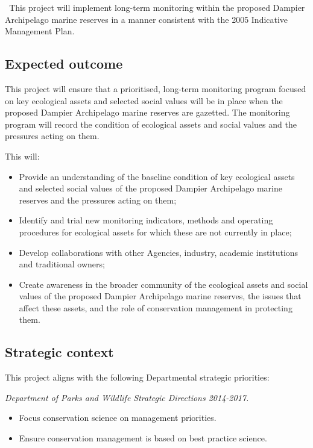 \documentclass[version=last,
    paper=a4, %
    10pt, %
    usenames,
    dvipsnames,
    twoside, %
    headings=openany, %
    BCOR=7mm, %
    DIV=15, %
    toc=chapterentrywithdots %
]{scrbook}
\begin{document}
\emph{~}This project will implement long-term monitoring within the
proposed Dampier Archipelago marine reserves in a manner consistent with
the 2005 Indicative Management Plan.~



\subsection*{Expected outcome}
This project will ensure that a prioritised, long-term monitoring
program focused on key ecological assets and selected social values will
be in place when the proposed Dampier Archipelago marine reserves are
gazetted. The monitoring program will record the condition of ecological
assets and social values and the pressures acting on them.

This will:

\begin{itemize}
\itemsep1pt\parskip0pt
\item
  Provide an understanding of the baseline condition of key ecological
  assets and selected social values of the proposed Dampier Archipelago
  marine reserves and the pressures acting on them;
\item
  Identify and trial new monitoring indicators, methods and operating
  procedures for ecological assets for which these are not currently in
  place;
\item
  Develop collaborations with other Agencies, industry, academic
  institutions and traditional owners;
\item
  Create awareness in the broader community of the ecological assets and
  social values of the proposed Dampier Archipelago marine reserves, the
  issues that affect these assets, and the role of conservation
  management in protecting them.
\end{itemize}



\subsection*{Strategic context}
This project aligns with the following Departmental strategic
priorities:

\emph{Department of Parks and Wildlife Strategic Directions 2014-2017.}

\begin{itemize}
\itemsep1pt\parskip0pt
\item
  Focus conservation science on management priorities.
\item
  Ensure conservation management is based on best practice science.
\end{itemize}
\end{document}
